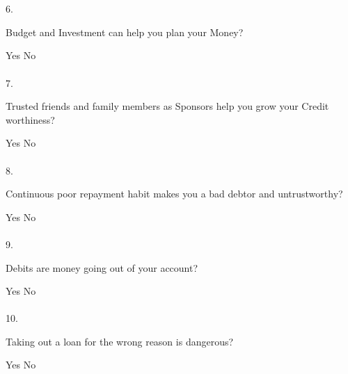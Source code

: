 \documentclass[a5paper]{sdapsclassic}
\begin{document}
\begin{questionnaire}
		\\
		\\
		6.\hspace{6pt}\begin{minipage}{40em}Budget and Investment can help you plan your Money? \end{minipage}\break
		\hspace{25pt}\textcolor{black}{\mycheckbox{}{}}Yes\hspace{8pt}%
		\textcolor{black}{\mycheckbox{}{}}No%
		\\
		\\
		7.\hspace{6pt}\begin{minipage}{30em}Trusted friends and family members as Sponsors help you grow your Credit worthiness?\end{minipage}\break
		\hspace{25pt}\textcolor{black}{\mycheckbox{}{}}Yes\hspace{8pt}%
		\textcolor{black}{\mycheckbox{}{}}No%
		\\
		\\
		8.\hspace{6pt}\begin{minipage}{30em}Continuous poor repayment habit makes you a bad debtor and untrustworthy? \end{minipage}\break
		\hspace{25pt}\textcolor{black}{\mycheckbox{}{}}Yes\hspace{8pt}%
		\textcolor{black}{\mycheckbox{}{}}No%
		\\
		\\
		9.\hspace{6pt}\begin{minipage}{40em}Debits are money going out of your account? \end{minipage}\break
		\hspace{25pt}\textcolor{black}{\mycheckbox{}{}}Yes\hspace{8pt}%
		\textcolor{black}{\mycheckbox{}{}}No%
		\\
		\\
		10.\hspace{2pt}\begin{minipage}{40em}Taking out a loan for the wrong reason is dangerous? \end{minipage}\break
		\hspace{25pt}\textcolor{black}{\mycheckbox{}{}}Yes\hspace{8pt}%
		\textcolor{black}{\mycheckbox{}{}}No%
	\end{questionnaire}
\end{document}
